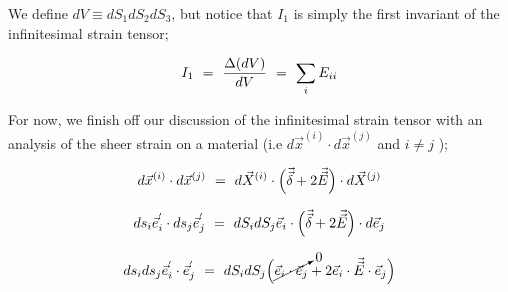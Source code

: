 \documentclass{article}
\begin{document}
We define \begin{math} dV \equiv  dS_1 dS_2 dS_3 \end{math}, but notice that \begin{math} I_1 \end{math} is simply the first invariant of the infinitesimal strain tensor;

\begin{equation} \label{eq:1}
 I_1 \hspace{0.125cm} = \hspace{0.125cm}  \frac{\Delta ( dV )}{dV} \hspace{0.125cm} = \hspace{0.125cm} \sum_i E_{i i} 
\end{equation} 

For now, we finish off our discussion of the infinitesimal strain tensor with an analysis of the sheer strain on a material (i.e \begin{math} d \vec{x}^{( i )} \cdot d \vec{x}^{( j )}  \end{math} and \begin{math} i \neq j \end{math} );

\begin{equation} \label{eq:1}
d \vec{x}^{( i )} \cdot d \vec{x}^{( j )} \hspace{0.125cm} = \hspace{0.125cm} d \vec{X}^{( i )} \cdot \Big( \vec{\vec{\delta}} + 2 \vec{\vec{E}} \Big) \cdot d \vec{X}^{( j )} 
\end{equation} 

\begin{equation} \label{eq:1}
ds_i \vec{e}_i^{\vspace{0.025cm} '} \cdot ds_j \vec{e}_j^{\vspace{0.025cm} '} \hspace{0.125cm} = \hspace{0.125cm} dS_i dS_j \vec{e}_i \cdot \Big( \vec{\vec{\delta}} + 2 \vec{\vec{E}} \Big) \cdot d \vec{e}_j
\end{equation} 

\begin{equation} \label{eq:1}
ds_i ds_j \vec{e}_i^{\vspace{0.025cm} '} \cdot \vec{e}_j^{\vspace{0.025cm} '} \hspace{0.125cm} = \hspace{0.125cm} dS_i dS_j \Big( \cancelto{0}{\vec{e}_i \cdot \vec{e}_j} + 2 \vec{e}_i \cdot \vec{\vec{E}} \cdot \vec{e}_j  \Big) 
\end{equation} 
\end{document}
